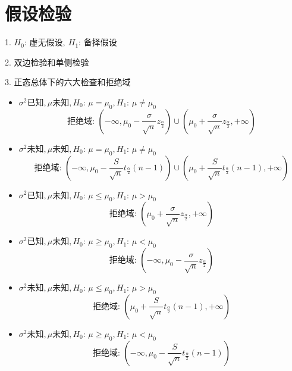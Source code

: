 \section{假设检验}
\begin{definition}[统计性检验]
	1. $H_{0}\text{: 虚无假设},\ H_{1}\text{: 备择假设}$
	
	2. 双边检验和单侧检验
	
	3. 正态总体下的六大检查和拒绝域
	\begin{itemize}
		\item $\sigma^2\text{已知},\mu\text{未知},H_{0}\text{: }\mu=\mu_{0},H_{1}\text{: }\mu\neq \mu_{0}$
		$$\text{拒绝域: }(-\infty,\mu_{0}-\frac{\sigma}{\sqrt{n}}z_{\frac{\alpha}{2}})\cup (\mu_{0}+\frac{\sigma}{\sqrt{n}}z_{\frac{\alpha}{2}},+\infty)$$
		\item $\sigma^2\text{未知},\mu\text{未知},H_{0}\text{: }\mu=\mu_{0},H_{1}\text{: }\mu\neq \mu_{0}$
		$$\text{拒绝域: }(-\infty,\mu_{0}-\frac{S}{\sqrt{n}}t_{\frac{\alpha}{2}}(n-1))\cup (\mu_{0}+\frac{S}{\sqrt{n}}t_{\frac{\alpha}{2}}(n-1),+\infty)$$
		\item $\sigma^2\text{已知},\mu\text{未知},H_{0}\text{: }\mu\leq \mu_{0},H_{1}\text{: }\mu> \mu_{0}$
		$$\text{拒绝域: } (\mu_{0}+\frac{\sigma}{\sqrt{n}}z_{\frac{\alpha}{2}},+\infty)$$
		\item $\sigma^2\text{已知},\mu\text{未知},H_{0}\text{: }\mu\geq \mu_{0},H_{1}\text{: }\mu< \mu_{0}$
		$$\text{拒绝域: }(-\infty,\mu_{0}-\frac{\sigma}{\sqrt{n}}z_{\frac{\alpha}{2}})$$
		\item $\sigma^2\text{未知},\mu\text{未知},H_{0}\text{: }\mu\leq \mu_{0},H_{1}\text{: }\mu> \mu_{0}$
		$$\text{拒绝域: } (\mu_{0}+\frac{S}{\sqrt{n}}t_{\frac{\alpha}{2}}(n-1),+\infty)$$
		\item $\sigma^2\text{未知},\mu\text{未知},H_{0}\text{: }\mu\geq \mu_{0},H_{1}\text{: }\mu< \mu_{0}$
		$$\text{拒绝域: }(-\infty,\mu_{0}-\frac{S}{\sqrt{n}}t_{\frac{\alpha}{2}}(n-1))$$
	\end{itemize}
\end{definition}